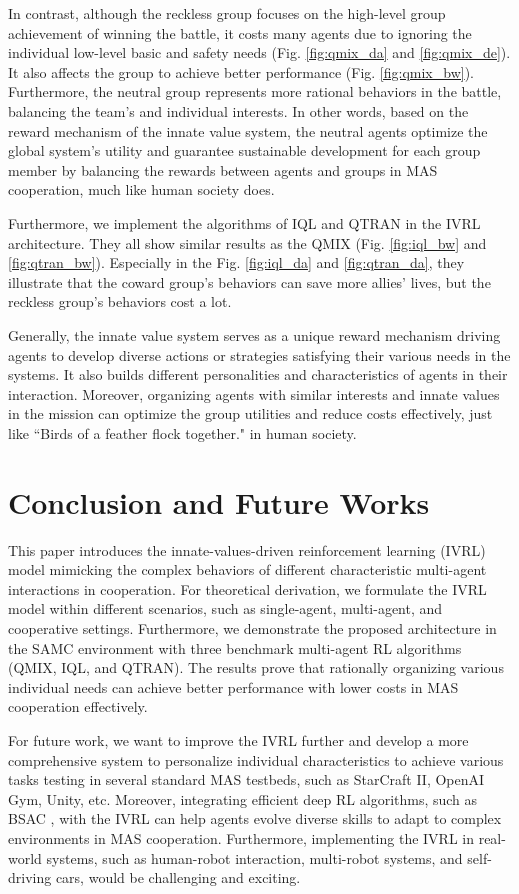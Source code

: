 \documentclass[letterpaper]{article} %
\begin{document}
In contrast, although the reckless group focuses on the high-level group achievement of winning the battle, it costs many agents due to ignoring the individual low-level basic and safety needs (Fig. \ref{fig:qmix_da} and \ref{fig:qmix_de}). It also affects the group to achieve better performance (Fig. \ref{fig:qmix_bw}). Furthermore, the neutral group represents more rational behaviors in the battle, balancing the team's and individual interests. In other words, based on the reward mechanism of the innate value system, the neutral agents optimize the global system’s utility and guarantee sustainable development for each group member by balancing the rewards between agents and groups in MAS cooperation, much like human society does.

Furthermore, we implement the algorithms of IQL and QTRAN in the IVRL architecture. They all show similar results as the QMIX (Fig. \ref{fig:iql_bw} and \ref{fig:qtran_bw}). Especially in the Fig. \ref{fig:iql_da} and \ref{fig:qtran_da}, they illustrate that the coward group's behaviors can save more allies' lives, but the reckless group's behaviors cost a lot.

Generally, the innate value system serves as a unique reward mechanism driving agents to develop diverse actions or strategies satisfying their various needs in the systems. It also builds different personalities and characteristics of agents in their interaction. Moreover, organizing agents with similar interests and innate values in the mission can optimize the group utilities and reduce costs effectively, just like ``Birds of a feather flock together." in human society.

\section{Conclusion and Future Works}

This paper introduces the innate-values-driven reinforcement learning (IVRL) model mimicking the complex behaviors of different characteristic multi-agent interactions in cooperation. For theoretical derivation, we formulate the IVRL model within different scenarios, such as single-agent, multi-agent, and cooperative settings. Furthermore, we demonstrate the proposed architecture in the SAMC environment with three benchmark multi-agent RL algorithms (QMIX, IQL, and QTRAN). The results prove that rationally organizing various individual needs can achieve better performance with lower costs in MAS cooperation effectively.

For future work, we want to improve the IVRL further and develop a more comprehensive system to personalize individual characteristics to achieve various tasks testing in several standard MAS testbeds, such as StarCraft II, OpenAI Gym, Unity, etc. Moreover, integrating efficient deep RL algorithms, such as BSAC \cite{yang2023strategy,yang2022bsac}, with the IVRL can help agents evolve diverse skills to adapt to complex environments in MAS cooperation. Furthermore, implementing the IVRL in real-world systems, such as human-robot interaction, multi-robot systems, and self-driving cars, would be challenging and exciting.



\end{document}
